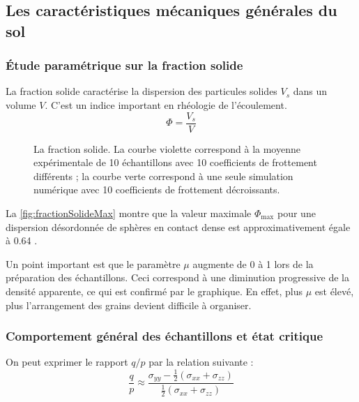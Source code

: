 \documentclass[a4paper,12pt]{report}
\begin{document}
\subsection{Les caractéristiques mécaniques générales du sol}

\subsubsection{Étude paramétrique sur la fraction solide}

La fraction solide caractérise la dispersion des particules solides $V_s$ dans un volume $V$.  
C'est un indice important en rhéologie de l'écoulement.  
\begin{equation}
\Phi = \dfrac{V_s}{V}
\end{equation}

\begin{figure}[h!]
    \centering
    \scalebox{0.5}{}
    \caption{La fraction solide. La courbe violette correspond à la moyenne expérimentale de 10 échantillons avec 10 coefficients de frottement différents ; la courbe verte correspond à une seule simulation numérique avec 10 coefficients de frottement décroissants.}
    \label{fig:fractionSolideMax}
\end{figure}

La \autoref{fig:fractionSolideMax} montre que la valeur maximale $\Phi_{\max}$ pour une dispersion désordonnée de sphères en contact dense est approximativement égale à 0.64  \citep{combe2023demlecture}.  

Un point important est que le paramètre $\mu$ augmente de 0 à 1 lors de la préparation des échantillons. Ceci correspond à une diminution progressive de la densité apparente, ce qui est confirmé par le graphique. En effet, plus $\mu$ est élevé, plus l’arrangement des grains devient difficile à organiser.

\subsubsection{Comportement général des échantillons et état critique}

On peut exprimer le rapport $q/p$ par la relation suivante :
\begin{equation}
\frac{q}{p} \approx \frac{\sigma_{yy} - \frac{1}{2}(\sigma_{xx} + \sigma_{zz})}{\frac{1}{2}(\sigma_{xx} + \sigma_{zz})}
\label{eq:qformulation}
\end{equation}
\end{document}
